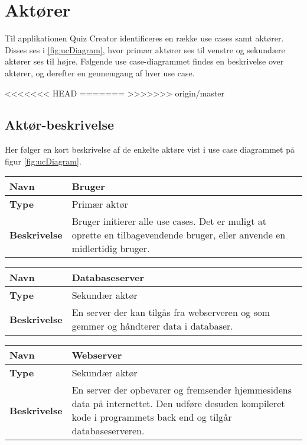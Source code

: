 \section{Aktører}

Til applikationen Quiz Creator identificeres en række use cases samt aktører. Disses ses i \ref{fig:ucDiagram}, hvor primær aktører ses til venstre og sekundære aktører ses til højre. Følgende use case-diagrammet findes en beskrivelse over aktører, og derefter en gennemgang af hver use case. 

<<<<<<< HEAD
=======
>>>>>>> origin/master

\subsection{Aktør-beskrivelse}
Her følger en kort beskrivelse af de enkelte aktøre vist i use case diagrammet på figur \ref{fig:ucDiagram}.

\begin{tabular}{|p{2cm}|p{12cm}|}

\hline 
\textbf{Navn} & Bruger \\ 
\hline 
\textbf{Type} & Primær aktør \\ 
\hline 
\textbf{Beskrivelse} & Bruger initierer alle use cases. Det er muligt at oprette en tilbagevendende bruger, eller anvende en midlertidig bruger.\\ 
\hline 

\end{tabular} 

\begin{tabular}{|p{2cm}|p{12cm}|}

\hline 
\textbf{Navn} & Databaseserver \\ 
\hline 
\textbf{Type} & Sekundær aktør \\ 
\hline 
\textbf{Beskrivelse} & En server der kan tilgås fra webserveren og som gemmer og håndterer data i databaser.\\ 
\hline 

\end{tabular} 

\begin{tabular}{|p{2cm}|p{12cm}|}

\hline 
\textbf{Navn} & Webserver \\ 
\hline 
\textbf{Type} & Sekundær aktør \\ 
\hline 
\textbf{Beskrivelse} & En server der opbevarer og fremsender hjemmesidens data på internettet. Den udføre desuden kompileret kode i programmets back end og tilgår databaseserveren. \\ 
\hline 

\end{tabular} 